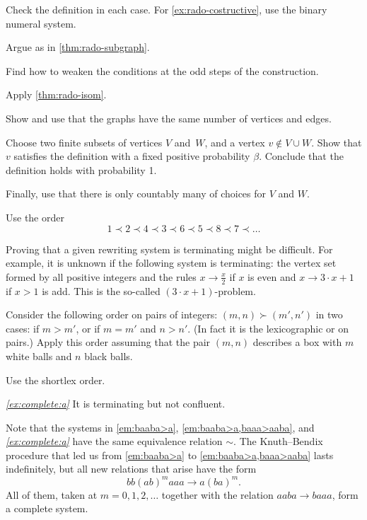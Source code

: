 Check the definition in each case.
For \ref{ex:rado-costructive}, use the binary numeral system.


Argue as in \ref{thm:rado-subgraph}.

Find how to weaken the conditions at the odd steps of the construction.

Apply \ref{thm:rado-isom}.

Show and use that the graphs have the same number of vertices and edges.

Choose two finite subsets of vertices $V$ and~$W$, and a vertex $v\notin V\cup W$.
Show that $v$ satisfies the definition with a fixed positive probability $\beta$.
Conclude that the definition holds with probability 1.

Finally, use that there is only countably many of choices for $V$ and $W$.

Use the order 
\[1\prec 2\prec 4\prec 3\prec 6\prec 5\prec 8\prec 7\prec\dots\]

Proving that a given rewriting system is terminating might be difficult.
For example,
it is unknown if the following system is terminating:
the vertex set formed by all positive integers and the rules $x\to \tfrac x2$ if $x$ is even and $x\to 3\cdot x+1$ if $x>1$ is add.
This is the so-called $(3\cdot x+1)$-problem.

Consider the following order on pairs of integers:
$(m,n)\succ(m',n')$ in two cases: if $m>m'$, or if $m=m'$ and $n>n'$.
(In fact it is the lexicographic or on pairs.)
Apply this order assuming that the pair $(m,n)$ describes a box with $m$ white balls and $n$ black balls.

Use the shortlex order.

\textit{\ref{ex:complete:a}} It is terminating but not confluent.

 Note that the systems in \ref{em:baaba>a}, \ref{em:baaba>a,baaa>aaba}, and \textit{\ref{ex:complete:a}} have the same equivalence relation $\sim$.
The Knuth--Bendix procedure that led us from \ref{em:baaba>a} to \ref{em:baaba>a,baaa>aaba} lasts indefinitely, but all new relations that arise have the form
\[bb(ab)^{m}aaa\to a(ba)^m.\]
All of them, taken at $m=0,1,2,\dots$ together with the relation $aaba\to baaa$, form a complete system.

